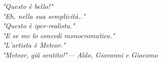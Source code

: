 \documentclass[twoside,openright,titlepage,
	headinclude,12pt,a4paper,BCOR=5mm,footinclude,bibliography=totoc,listof=totoc]{scrbook}
\begin{document}
\frenchspacing
\raggedbottom
{}
\pagestyle{plain}

\pagestyle{scrheadings}
\tableofcontents
\listoffigures
\cleardoublepage
\thispagestyle{empty}
\begin{flushright}
	\null{}
	\emph{"Questo è bello!"\\
		"Eh, nella sua semplicità.."\\
		"Questo è iper-realista."\\
		"E se me lo concedi monocromatico."\\
		"L'artista è Meteor."\\
		"Meteor, già sentito!"\break --- Aldo, Giovanni e Giacomo} \null
\end{flushright}
\cleardoublepage









\nocite{*} %
\printbibliography

\end{document}
